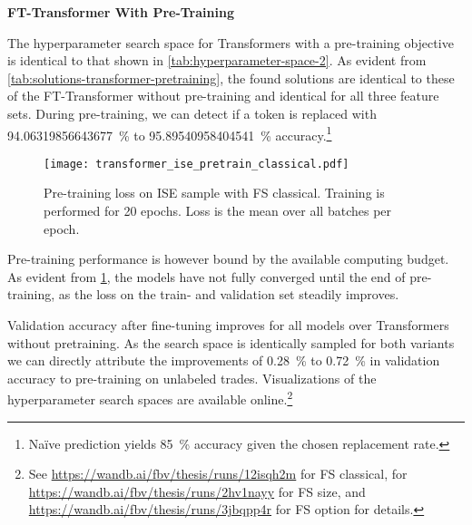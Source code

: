 \textbf{FT-Transformer With Pre-Training}

The hyperparameter search space for Transformers with a pre-training objective is identical to that shown in \cref{tab:hyperparameter-space-2}. As evident from \cref{tab:solutions-transformer-pretraining}, the found solutions are identical to these of the FT-Transformer without pre-training and identical for all three feature sets. During pre-training, we can detect if a token is replaced with \SI{94.06319856643677}{\percent} to \SI{95.89540958404541}{\percent} accuracy.\footnote{Na\"ive prediction yields \SI{85}{\percent} accuracy given the chosen replacement rate.} 

\begin{figure}[!h]
    \centering
    \texttt{[image: transformer\_ise\_pretrain\_classical.pdf]}
    \caption[Pre-Training Loss of FT-Transformer]{Pre-training loss on \gls{ISE} sample with \gls{FS} classical. Training is performed for 20 epochs. Loss is the mean over all batches per epoch.}
    \label{fig:fttransformer-pretrain-loss}
\end{figure}

Pre-training performance is however bound by the available computing budget. As evident from \cref{fig:fttransformer-pretrain-loss}, the models have not fully converged until the end of pre-training, as the loss on the train- and validation set steadily improves.

Validation accuracy after fine-tuning improves for all models over Transformers without pretraining. As the search space is identically sampled for both variants we can directly attribute the improvements of \SI{0.28}{\percent} to \SI{0.72}{\percent} in validation accuracy to pre-training on unlabeled trades. Visualizations of the hyperparameter search spaces are available online.\footnote{See \url{https://wandb.ai/fbv/thesis/runs/12isqh2m} for \gls{FS} classical, for \url{https://wandb.ai/fbv/thesis/runs/2hv1nayy} for \gls{FS} size, and \url{https://wandb.ai/fbv/thesis/runs/3jbqpp4r} for \gls{FS} option for details.}


